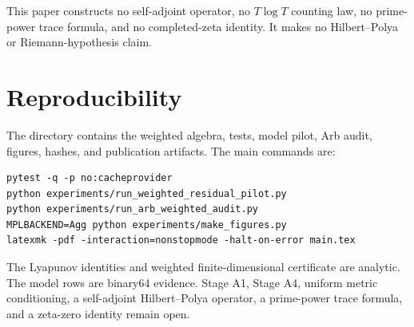 \documentclass[11pt]{article}
\begin{document}
This paper constructs no self-adjoint operator, no $T\log T$ counting law,
no prime-power trace formula, and no completed-zeta identity.  It makes no
Hilbert--Polya or Riemann-hypothesis claim.

\section{Reproducibility}

The directory contains the weighted algebra, tests, model pilot, Arb audit,
figures, hashes, and publication artifacts.  The main commands are:
\begin{verbatim}
pytest -q -p no:cacheprovider
python experiments/run_weighted_residual_pilot.py
python experiments/run_arb_weighted_audit.py
MPLBACKEND=Agg python experiments/make_figures.py
latexmk -pdf -interaction=nonstopmode -halt-on-error main.tex
\end{verbatim}

The Lyapunov identities and weighted finite-dimensional certificate are
analytic.  The model rows are binary64 evidence.  Stage A1, Stage A4,
uniform metric conditioning, a self-adjoint Hilbert--Polya operator, a
prime-power trace formula, and a zeta-zero identity remain open.



\end{document}
